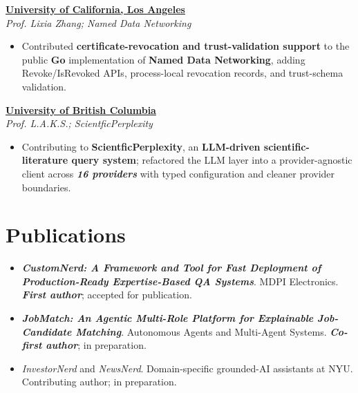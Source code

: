 \documentclass[10pt,a4paper]{article}
\newcommand{\metric}[1]{\textbf{\textit{#1}}}
\newcommand{\tech}[1]{\textbf{#1}}
\newcommand{\project}[1]{\textbf{#1}}
\newcommand{\researchentry}[2]{%
  \textbf{\underline{#1}}\\%
  \textit{#2}\vspace{-1pt}%
}
\begin{document}
\researchentry{University of California, Los Angeles}{Prof. Lixia Zhang; Named Data Networking}
\begin{itemize}
  \item Contributed \project{certificate-revocation and trust-validation support} to the public \tech{Go} implementation of \tech{Named Data Networking}, adding Revoke/IsRevoked APIs, process-local revocation records, and trust-schema validation.
\end{itemize}

\researchentry{University of British Columbia}{Prof. L.A.K.S.; ScientficPerplexity}
\begin{itemize}
  \item Contributing to \project{ScientficPerplexity}, an \tech{LLM-driven scientific-literature query system}; refactored the LLM layer into a provider-agnostic client across \metric{16 providers} with typed configuration and cleaner provider boundaries.
\end{itemize}

\section{Publications}
\begin{itemize}
  \item \textit{\textbf{CustomNerd: A Framework and Tool for Fast Deployment of Production-Ready Expertise-Based QA Systems}}. MDPI Electronics. \metric{First author}; accepted for publication.
  \item \textit{\textbf{JobMatch: An Agentic Multi-Role Platform for Explainable Job-Candidate Matching}}. Autonomous Agents and Multi-Agent Systems. \metric{Co-first author}; in preparation.
  \item \textit{InvestorNerd} and \textit{NewsNerd}. Domain-specific grounded-AI assistants at NYU. Contributing author; in preparation.
\end{itemize}
\end{document}
